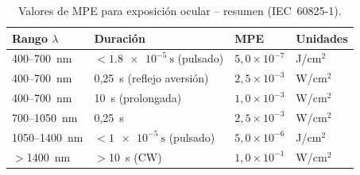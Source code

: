 \documentclass[12pt,a4paper]{article}
\begin{document}
\begin{table}[H]
	\centering
	\caption{Valores de MPE para exposición ocular -- resumen (IEC~60825-1).}
	\label{tab:mpe_ref}
	\small
	\begin{tabular}{l l l l}
		\toprule
		\textbf{Rango $\lambda$} & \textbf{Duración}                 & \textbf{MPE}         & \textbf{Unidades} \\
		\midrule
		400--700~nm              & $<\SI{1.8e-5}{\second}$ (pulsado) & $5{,}0\times10^{-7}$ & J/cm$^2$          \\
		400--700~nm              & 0,25~s (reflejo aversión)         & $2{,}5\times10^{-3}$ & W/cm$^2$          \\
		400--700~nm              & 10~s (prolongada)                 & $1{,}0\times10^{-3}$ & W/cm$^2$          \\
		700--1050~nm             & 0,25~s                            & $2{,}5\times10^{-3}$ & W/cm$^2$          \\
		1050--1400~nm            & $<\SI{1e-5}{\second}$ (pulsado)   & $5{,}0\times10^{-6}$ & J/cm$^2$          \\
		$>$1400~nm               & $>$10~s (CW)                      & $1{,}0\times10^{-1}$ & W/cm$^2$          \\
		\bottomrule
	\end{tabular}
\end{table}
\end{document}
